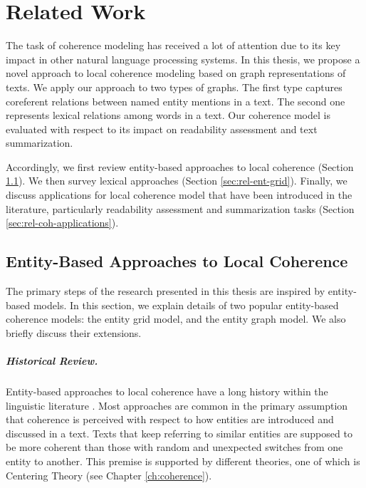 
\chapter{Related Work}
\label{ch:rel-work}
 
The task of coherence modeling has received a lot of attention due to its key impact in other natural language processing systems. 
In this thesis, we propose a novel approach to local coherence modeling based on graph representations of texts. 
We apply our approach to two types of graphs.  
The first type captures coreferent relations between named entity mentions in a text.
The second one represents lexical relations among words in a text.  
Our coherence model is evaluated with respect to its impact on readability assessment and text summarization. 

Accordingly, we first review entity-based approaches to local coherence (Section \ref{sec:rel-entity-models}). 
We then survey lexical approaches (Section \ref{sec:rel-ent-grid}). 
Finally, we discuss applications for local coherence model that have been introduced in the literature, particularly readability assessment and summarization tasks (Section \ref{sec:rel-coh-applications}). 

\section{Entity-Based Approaches to Local Coherence}
\label{sec:rel-entity-models}

The primary steps of the research presented in this thesis are inspired by entity-based models. 
In this section, we explain details of two popular entity-based coherence models: the entity grid model, and the entity graph model. 
We also briefly discuss their extensions.  

\paragraph{Historical Review.} Entity-based approaches to local coherence have a long history within the linguistic literature \cite{kuno72,halliday76,prince81a,joshi98}.
Most approaches are common in the primary assumption that coherence is perceived with respect to how entities are introduced and discussed in a text. 
Texts that keep referring to similar entities are supposed to be more coherent than those with random and unexpected switches from one entity to another. 
This premise is supported by different theories, one of which is Centering Theory \cite{grosz95,joshi98} (see Chapter \ref{ch:coherence}). 

